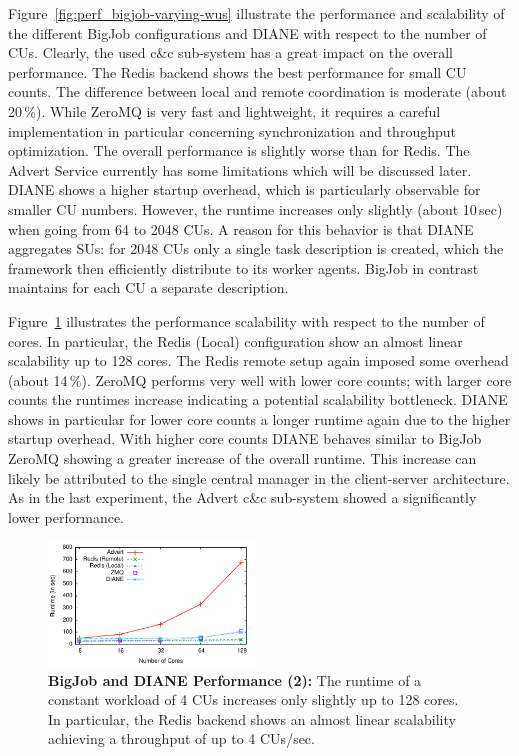 \documentclass[conference,final]{IEEEtran}
\newcommand{\cu}{CU\xspace}
\newcommand{\cus}{CUs\xspace}
\newcommand{\upp}{\vspace*{-0.5em}}
\begin{document}
Figure~\ref{fig:perf_bigjob-varying-wus} illustrate the performance and
scalability of the different BigJob configurations and DIANE with respect to the
number of \cus. Clearly, the used c\&c sub-system has a great impact on the
overall performance. The Redis backend shows the best performance for small \cu 
counts. The difference between local and remote coordination is moderate (about
20\,\%). While ZeroMQ is very fast and lightweight, it requires a careful
implementation in particular concerning synchronization and throughput
optimization. The overall performance is slightly worse than for Redis. The
Advert Service currently has some limitations which will be discussed later.
DIANE shows a higher startup overhead, which is particularly observable for
smaller \cu  numbers. However, the runtime increases only slightly (about 10\,sec)
when going from 64 to 2048 \cus. A reason for this behavior is that DIANE
aggregates SUs: for 2048 \cus only a single task description is created, which
the framework then efficiently distribute to its worker agents. BigJob in
contrast maintains for each \cu  a separate description. 

Figure~\ref{fig:perf_bigjob-varying-cores} illustrates the performance
scalability with respect to the number of cores. In particular, the Redis
(Local) configuration show an almost linear scalability up to 128 cores. The
Redis remote setup again imposed some overhead (about 14\,\%). ZeroMQ performs
very well with lower core counts; with larger core counts the runtimes increase
indicating a potential scalability bottleneck. DIANE shows in particular for
lower core counts a longer runtime again due to the higher startup overhead.
With higher core counts DIANE behaves similar to BigJob ZeroMQ showing a greater
increase of the overall runtime. This increase can likely be attributed to
the single central manager in the client-server architecture. As in the last
experiment, the Advert c\&c sub-system showed a significantly lower performance.

\begin{figure}[htbp] \centering
\includegraphics[width=0.49\textwidth]{perf/bigjob-varying-cores-alamo.pdf}
\caption{\textbf{BigJob and DIANE Performance (2):}  The
runtime of a constant workload of 4 \cus 
increases only slightly up to 128 cores. In particular, the Redis backend shows
an almost linear scalability achieving a throughput of up to 4 \cus/sec. }
\label{fig:perf_bigjob-varying-cores} 
\upp\upp
\end{figure}
\end{document}

